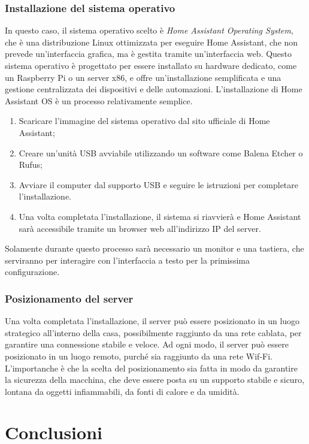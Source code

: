 \documentclass[11pt, a4paper]{article}
\begin{document}
\subsubsection{Installazione del sistema operativo}
In questo caso, il sistema operativo scelto è \textit{Home Assistant Operating System}, che è una distribuzione Linux
ottimizzata per eseguire Home Assistant, che non prevede un'interfaccia grafica, ma è gestita tramite un'interfaccia web.
Questo sistema operativo è progettato per essere installato su hardware dedicato, come un Raspberry Pi o un server x86, 
e offre un'installazione semplificata e una gestione centralizzata dei dispositivi e delle automazioni.
L'installazione di Home Assistant OS è un processo relativamente semplice.
\begin{enumerate}
    \item Scaricare l'immagine del sistema operativo dal sito ufficiale di Home Assistant;
    \item Creare un'unità USB avviabile utilizzando un software come Balena Etcher o Rufus;
    \item Avviare il computer dal supporto USB e seguire le istruzioni per completare l'installazione.
    \item Una volta completata l'installazione, il sistema si riavvierà e Home Assistant sarà accessibile tramite un browser web all'indirizzo IP del server.
\end{enumerate}

Solamente durante questo processo sarà necessario un monitor e una tastiera, che serviranno per interagire con l'interfaccia
a testo per la primissima configurazione.
\subsubsection{Posizionamento del server}
Una volta completata l'installazione, il server può essere posizionato in un luogo strategico all'interno della casa,
possibilmente raggiunto da una rete cablata, per garantire una connessione stabile e veloce.
Ad ogni modo, il server può essere posizionato in un luogo remoto, purché sia raggiunto da una rete Wif-Fi.
L'importanche è che la scelta del posizionamento sia fatta in modo da garantire la sicurezza della macchina, che deve
essere posta su un supporto stabile e sicuro, lontana da oggetti infiammabili, da fonti di calore e da umidità.



\section{Conclusioni}
\end{document}
